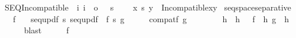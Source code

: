 \begin{isabellebody}
\isanewline
{}\isamarkupfalse%
\ SEQIncompatible\ {\isacharcolon}{\kern0pt}{\isacharcolon}{\kern0pt}\ {\isachardoublequoteopen}{\isacharbrackleft}{\kern0pt}i{\isacharcomma}{\kern0pt}\ i{\isacharbrackright}{\kern0pt}\ {\isasymRightarrow}\ o{\isachardoublequoteclose}\ \ {\isacharparenleft}{\kern0pt}\ {\isachardoublequoteopen}{\isasymbottom}s{\isachardoublequoteclose}\ {}{}{\isacharparenright}{\kern0pt}\isanewline
\ \ \ {\isachardoublequoteopen}x\ {\isasymbottom}s\ y\ {\isasymequiv}\ Incompatible{\isacharparenleft}{\kern0pt}x{\isacharcomma}{\kern0pt}y{\isacharparenright}{\kern0pt}{\isachardoublequoteclose}\isanewline
\isanewline
{}\isamarkupfalse%
\ seqspace{\isacharunderscore}{\kern0pt}separative{\isacharcolon}{\kern0pt}\isanewline
\ \ \ {\isachardoublequoteopen}f{\isasymin}{}{\isacharcircum}{\kern0pt}{\isacharless}{\kern0pt}{\isasymomega}{\isachardoublequoteclose}\isanewline
\ \ \ {\isachardoublequoteopen}seq{\isacharunderscore}{\kern0pt}upd{\isacharparenleft}{\kern0pt}f{\isacharcomma}{\kern0pt}{}{\isacharparenright}{\kern0pt}\ {\isasymbottom}s\ seq{\isacharunderscore}{\kern0pt}upd{\isacharparenleft}{\kern0pt}f{\isacharcomma}{\kern0pt}{}{\isacharparenright}{\kern0pt}{\isachardoublequoteclose}\ {\isacharparenleft}{\kern0pt}\ {\isachardoublequoteopen}{\isacharquery}{\kern0pt}f\ {\isasymbottom}s\ {\isacharquery}{\kern0pt}g{\isachardoublequoteclose}{\isacharparenright}{\kern0pt}\isanewline
%
\isadelimproof
%
\endisadelimproof
%
\isatagproof
{}\isamarkupfalse%
\ \isanewline
\ \ \isamarkupfalse%
\ {\isachardoublequoteopen}compat{\isacharparenleft}{\kern0pt}{\isacharquery}{\kern0pt}f{\isacharcomma}{\kern0pt}\ {\isacharquery}{\kern0pt}g{\isacharparenright}{\kern0pt}{\isachardoublequoteclose}\isanewline
\ \ \isamarkupfalse%
\ \isanewline
\ \ \isamarkupfalse%
\ h\ \ {\isachardoublequoteopen}h\ {\isasymin}\ {}{\isacharcircum}{\kern0pt}{\isacharless}{\kern0pt}{\isasymomega}{\isachardoublequoteclose}\ {\isachardoublequoteopen}{\isacharquery}{\kern0pt}f\ {\isasymsubseteq}\ h{\isachardoublequoteclose}\ {\isachardoublequoteopen}{\isacharquery}{\kern0pt}g\ {\isasymsubseteq}\ h{\isachardoublequoteclose}\isanewline
\ \ \ \ \isamarkupfalse%
\ blast\isanewline
\ \ \isamarkupfalse%
\ \isamarkupfalse%
\ {\isacartoucheopen}f{\isasymin}{\isacharunderscore}{\kern0pt}{\isacartoucheclose}\isanewline

\end{isabellebody}
